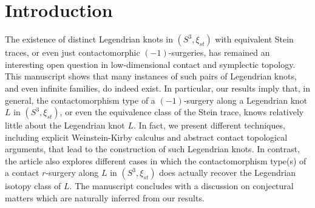\documentclass[11pt]{amsart} %
\theoremstyle{plain}
\theoremstyle{definition}
\begin{document}
\maketitle


\section{Introduction}

The existence of distinct Legendrian knots in $(S^3,\xi_{st})$ with equivalent Stein traces, or even just contactomorphic $(-1)$-surgeries, has remained an interesting open question in low-dimensional contact and symplectic topology. This manuscript shows that many instances of such pairs of Legendrian knots, and even infinite families, do indeed exist. In particular, our results imply that, in general, the contactomorphism type of a $(-1)$-surgery along a Legendrian knot $L$ in $(S^3,\xi_{st})$, or even the equivalence class of the Stein trace, knows relatively little about the Legendrian knot $L$. In fact, we present different techniques, including explicit Weinstein-Kirby calculus and abstract contact topological arguments, that lead to the construction of such Legendrian knots. In contrast, the article also explores different cases in which the contactomorphism type(s) of a contact $r$-surgery along $L$ in $(S^3,\xi_{st})$ does actually recover the Legendrian isotopy class of $L$. The manuscript concludes with a discussion on conjectural matters which are naturally inferred from our results.
\end{document}
